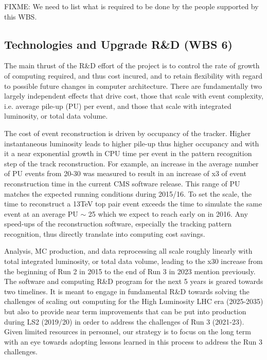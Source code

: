 \documentclass[11pt,a4paper]{article}
\begin{document}
{FIXME: We need to list what is required to be done by the people
  supported by this WBS.}

\subsection{Technologies and Upgrade R\&D (WBS 6)}

The main thrust of the R\&D effort of the project is to control the
rate of growth of computing required, and thus cost incured, and to retain
flexibility with regard to possible future changes in computer architecture.  
There are fundamentally two largely independent effects that drive cost,
those that scale with event complexity, i.e. average pile-up (PU) per event, 
and those that scale with integrated luminosity, or total data volume.

The cost of event reconstruction is driven by occupancy of the tracker.
Higher instantaneous luminosity leads to higher pile-up thus higher
occupancy and with it a near exponential growth in CPU time per event 
in the pattern recognition step of the track reconstruction. 
For example, an increase in the average number of PU events from 20-30
was measured to result in an increase of x3 of event reconstruction time in the current CMS software release. 
This range of PU matches the expected running conditions during 2015/16.
To set the scale, the time to reconstruct a 13TeV top pair event exceeds the time to simulate
the same event at an average PU $\sim$ 25 which we expect to reach early on in 2016.
Any speed-ups of the reconstruction software, especially the tracking pattern recognition, 
thus directly translate into computing cost savings.

Analysis, MC production, and data reprocessing all scale roughly linearly with total integrated luminosity, or total
data volume, leading to the x30 increase from the beginning of Run 2 in 2015 to the end of Run 3 in 2023 mention previously. 
The software and computing R\&D program for the next 5 years is geared towards two timelines. It is meant to
engage in fundamental R\&D towards solving the challenges of scaling out computing for the High Luminosity LHC era
(2025-2035) but also to provide near term improvements that can be put into production during LS2 (2019/20)
in order to address the challenges of Run 3 (2021-23). Given limited resources in personnel, our strategy is to focus
on the long term with an eye towards adopting lessons learned in this process to address the Run 3 challenges.
\end{document}
